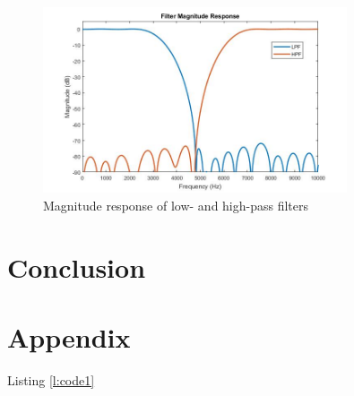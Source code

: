 \documentclass[11pt,pdftex,portrait,letterpaper]{article}
\begin{document}
\begin{figure}[h]
\centering
\includegraphics[width=0.8\textwidth]{./filtMag}
\caption{Magnitude response of low- and high-pass filters}
\label{f:fig1}
\end{figure}


\section{Conclusion}

\pagebreak


\section{Appendix}

Listing \ref{l:code1}

\begin{lstlisting}[caption={FFT and magnitude calculation}, label=l:code1]

\end{lstlisting}
\end{document}
